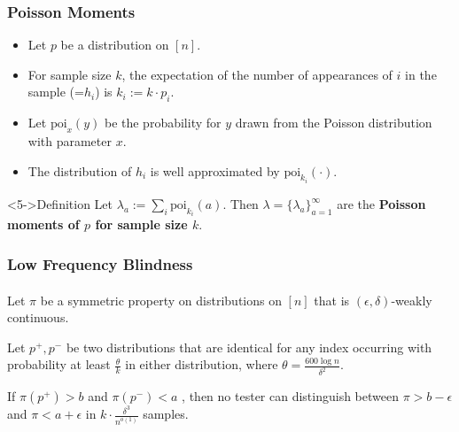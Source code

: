 \documentclass{beamer}
\begin{document}
\begin{frame}
  \frametitle{Poisson Moments}

  \begin{block}{}
    
    \begin{itemize}
    \item<1-> Let $p$ be a distribution on $[n]$.
    \item<2-> For sample size $k$, the expectation of the number of
      appearances of $i$ in the sample (=$h_i$) is $k_i:=k\cdot p_i$.
    \item<3-> Let $\mbox{poi}_x(y)$ be the probability for $y$ drawn
      from the Poisson distribution with parameter $x$.
    \item<4-> The distribution of $h_i$ is well approximated by
      $\mbox{poi}_{k_i}(\cdot)$.
    \end{itemize}
  \end{block}
  \begin{block}<5->{Definition} Let
    $\lambda_a:=\sum_i\mbox{poi}_{k_i}(a)$. Then
    $\lambda=\{\lambda_a\}_{a=1}^\infty$ are the {\bf Poisson moments
      of $p$ for sample size $k$}.
  \end{block}
\end{frame}



\begin{frame}
  \frametitle{Low Frequency Blindness} \framesubtitle{}
  \begin{theorem}
    Let $\pi$ be a symmetric property on distributions on $[n]$ that
    is $(\epsilon,\delta)$-weakly continuous.

    Let $p^+,p^-$ be two distributions that are identical for any
    index occurring with probability at least $\frac{\theta}{k}$ in
    either distribution, where $\theta=\frac{600\log n}{\delta^2}$.

    If $\pi(p^+)>b$ and $\pi(p^-)<a$ , then no tester can distinguish
    between $\pi>b-\epsilon$ and $\pi<a+\epsilon$ in $k\cdot
    \frac{\delta^3}{n^{o(1)}}$ samples.
  \end{theorem}
\end{frame}
\end{document}
